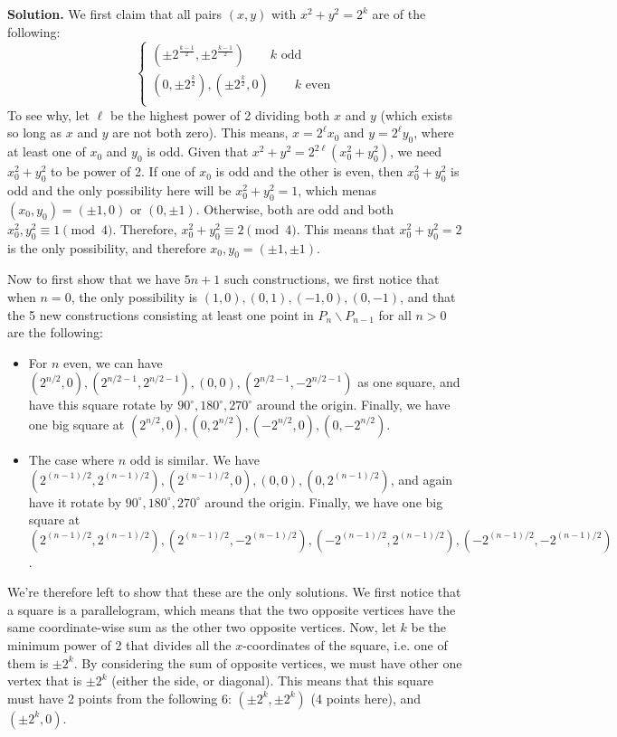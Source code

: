 \documentclass[11pt,a4paper]{article}
\newcommand{\<}{\langle}
\renewcommand{\>}{\rangle}
\begin{document}
\begin{enumerate}
	\textbf{Solution.} We first claim that all pairs $(x, y)$ with $x^2+y^2=2^k$ are of the following: 
	\[
	\begin{cases}
	(\pm 2^{\frac{k-1}{2}}, \pm 2^{\frac{k-1}{2}})\qquad k\text{ odd}\\
	(0, \pm 2^{\frac k2}), (\pm 2^{\frac k2}, 0)\qquad k\text{ even}\\
	\end{cases}
	\]
	To see why, let $\ell$ be the highest power of 2 dividing both $x$ and $y$ (which exists so long as $x$ and $y$ are not both zero). 
	This means, $x=2^{\ell}x_0$ and $y=2^{\ell}y_0$, where at least one of $x_0$ and $y_0$ is odd. 
	Given that $x^2+y^2=2^{2\ell}(x_0^2+y_0^2)$, we need $x_0^2+y_0^2$ to be power of 2. 
	If one of $x_0$ is odd and the other is even, then $x_0^2+y_0^2$ is odd and the only possibility here will be $x_0^2+y_0^2=1$, which menas $(x_0, y_0)=(\pm 1, 0)$ or $(0, \pm 1)$. 
	Otherwise, both are odd and both $x_0^2, y_0^2\equiv 1\pmod{4}$. 
	Therefore, $x_0^2+y_0^2\equiv 2\pmod{4}$. This means that $x_0^2+y_0^2=2$ is the only possibility, and therefore $x_0, y_0=(\pm 1, \pm 1)$. 
	
	Now to first show that we have $5n+1$ such constructions, we first notice that when $n=0$, the only possibility is $(1, 0), (0, 1), (-1, 0), (0, -1)$, and that the 5 new constructions consisting at least one point in $P_n\backslash P_{n-1}$ for all $n>0$ are the following: 
	\begin{itemize}
		\item For $n$ even, we can have $(2^{n/2}, 0), (2^{n/2-1}, 2^{n/2-1}), (0, 0), (2^{n/2-1}, -2^{n/2-1})$ as one square, and have this square rotate by $90^{\circ}, 180^{\circ}, 270^{\circ}$ around the origin. Finally, we have one big square at $(2^{n/2}, 0), (0, 2^{n/2}), (-2^{n/2}, 0), (0, -2^{n/2})$. 
		
		\item The case where $n$ odd is similar. We have $(2^{(n-1)/2}, 2^{(n-1)/2}), (2^{(n-1)/2}, 0), (0, 0), (0, 2^{(n-1)/2})$, and again have it rotate by $90^{\circ}, 180^{\circ}, 270^{\circ}$ around the origin. Finally, we have one big square at $(2^{(n-1)/2}, 2^{(n-1)/2}), (2^{(n-1)/2}, -2^{(n-1)/2}), (-2^{(n-1)/2}, 2^{(n-1)/2}), (-2^{(n-1)/2}, -2^{(n-1)/2})$. 
	\end{itemize}
	We're therefore left to show that these are the only solutions. We first notice that a square is a parallelogram, which means that the two opposite vertices have the same coordinate-wise sum as the other two opposite vertices. Now, let $k$ be the minimum power of 2 that divides all the $x$-coordinates of the square, i.e. one of them is $\pm 2^k$. By considering the sum of opposite vertices, we must have other one vertex that is $\pm 2^k$ (either the side, or diagonal). This means that this square must have 2 points from the following 6: $(\pm 2^k, \pm 2^k)$ (4 points here), and $(\pm 2^k, 0)$. 
	

\end{enumerate}
\end{document}
